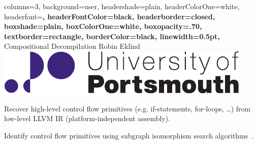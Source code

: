 \documentclass[a2paper,landscape,fontscale=0.35]{baposter}
\begin{document}
\begin{poster}{
	columns=3,
	background=user,
	headershade=plain,
	headerColorOne=white,
	headerfont=\Large\bfseries,
	headerFontColor=black,
	headerborder=closed,
	boxshade=plain,
	boxColorOne=white,
	boxopacity=.70,
	textborder=rectangle,
	borderColor=black,
	linewidth=0.5pt,
}
{}
{Compositional Decompilation}
{Robin Eklind}
{\includegraphics[height=0.05\textheight]{inc/logo.pdf}}

{
	Recover high-level control flow primitives (e.g. if-statements, for-loops, …) from low-level LLVM IR (platform-independent assembly).
}

{
	Identify control flow primitives using subgraph isomorphism search algorithms~\cite{decomp_of_llvm}.

	\setlength{\intextsep}{5pt}
	\setlength{\abovecaptionskip}{5pt}

}
\end{poster}
\end{document}
